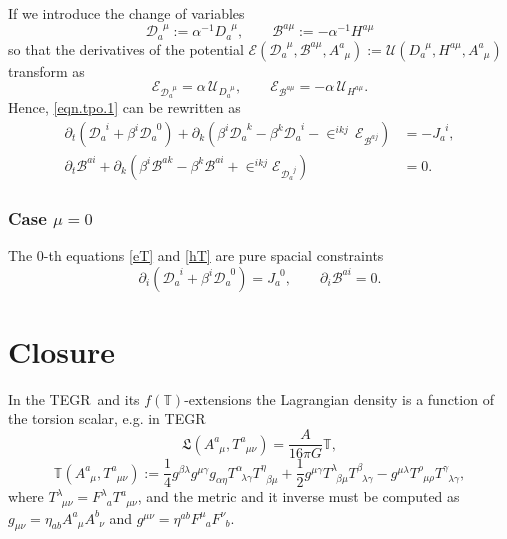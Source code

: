 \documentclass[
10pt, %
a4paper, %
oneside, %
headinclude,footinclude, %
BCOR5mm, %
]{scrartcl}
\newcommand{\pd}[1]{\partial_{#1}}
\newcommand{\itetr}[2]{F^{#1}_{\phantom{#1}#2}}
\newcommand{\tetr}[2]{A^{#1}_{\phantom{#1}#2}}
\newcommand{\deth}{A}
\newcommand{\Tors}[2]{T^{#1}_{\phantom{a}#2}}
\newcommand{\eT}[2]{D_{#1}^{\phantom{#1}#2}}	%
\newcommand{\dT}[2]{\mathcal{D}_{#1}^{\phantom{#1}#2}}	%
\newcommand{\hT}[2]{H^{#1#2}}	%
\newcommand{\bT}[2]{\mathcal{B}^{#1#2}}	%
\newcommand{\Lagtors}{\mathfrak{L}}%
\newcommand{\LagST}{\mathcal{U}}%
\newcommand{\Lagtpo}{\mathcal{E}}%
\newcommand{\LCsymb}{\bm{\in}}    %
\newcommand{\tegr}{TEGR}
\newcommand{\NC}[2]{J^{\phantom{#1}#2}_{#1}}
\newcommand{\lapse}{\alpha}
\newcommand{\shift}[1]{\beta^{#1}}
\newcommand{\Tscal}{\mathbb{T}}		%
\begin{document}
If we introduce the change of variables
\begin{equation}
	\dT{a}{\mu} := \lapse^{-1} \eT{a}{\mu}, \qquad \bT{a}{\mu} := -\lapse^{-1}\hT{a}{\mu}
\end{equation}
so that the derivatives of the potential $ \Lagtpo(\dT{a}{\mu},\bT{a}{\mu},\tetr{a}{\mu}) := 
\LagST(\eT{a}{\mu},\hT{a}{\mu},\tetr{a}{\mu})
$ 
transform as
\begin{equation}
	\Lagtpo_{\dT{a}{\mu}} =  \lapse \, \LagST_{\eT{a}{\mu}},
	\qquad
	\Lagtpo_{\bT{a}{\mu}} = -\lapse \, \LagST_{\hT{a}{\mu}}.
\end{equation}
Hence, \eqref{eqn.tpo.1} can be rewritten as
\begin{subequations}\label{eqn.tpo.2}
	\begin{align}
	\pd{t} (\dT{a}{i} + \shift{i} \dT{a}{0}) + \pd{k}(\shift{i} 
	\dT{a}{k} - \shift{k}\dT{a}{i}  - \LCsymb^{ikj} \,
	\Lagtpo_{\bT{a}{j}}) & 
	= -\NC{a}{i}, \\[2mm]
	\pd{t} \bT{a}{i} + \pd{k}(\shift{i} 
	\bT{a}{k} - \shift{k}\bT{a}{i}  + \LCsymb^{ikj} 
	\Lagtpo_{\dT{a}{j}}) & 
	= 0 .
	\end{align}
\end{subequations}



\subsubsection{Case $ \mu = 0 $} 

The $ 0 $-th equations \eqref{eT} and \eqref{hT} are pure spacial constraints
\begin{equation}
	\pd{i} (\dT{a}{i} + \shift{i}\dT{a}{0}) = \NC{a}{0}, 
	\qquad
	\pd{i} \bT{a}{i} = 0.
\end{equation}





\section{Closure}



In the \tegr\ and its $ f(\Tscal) $-extensions the Lagrangian density is a function of the 
torsion scalar, e.g. in \tegr\ 
\begin{equation}
	\Lagtors(\tetr{a}{\mu},\Tors{a}{\mu\nu}) = \frac{\deth}{16\pi G} \Tscal,
\end{equation}
\begin{equation}
	\Tscal(\tetr{a}{\mu},\Tors{a}{\mu\nu}) := \frac14 g^{\beta\lambda} g^{\mu\gamma} g_{\alpha\eta} 
	\Tors{\alpha}{\lambda\gamma}
	\Tors{\eta}{\beta\mu} +
			  \frac12 g^{\mu\gamma} \Tors{\lambda}{\beta\mu} \Tors{\beta}{\lambda\gamma} - 
			  g^{\mu\lambda} \Tors{\rho}{\mu\rho} \Tors{\gamma}{\lambda\gamma},	  
\end{equation}
where $ \Tors{\lambda}{\mu\nu} = \itetr{\lambda}{a} \Tors{a}{\mu\nu} $, and the metric and it 
inverse must be computed as $ g_{\mu\nu} = 
\eta_{ab}\tetr{a}{\mu}\tetr{b}{\nu} $ and $ g^{\mu\nu} = \eta^{ab}\itetr{\mu}{a}\itetr{\nu}{b}$.
\end{document}
